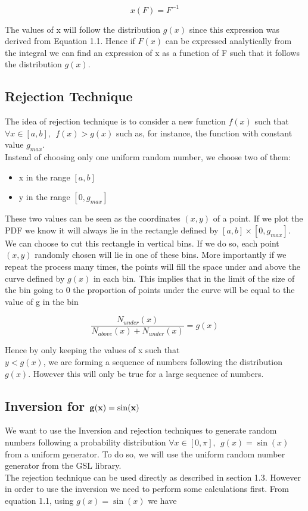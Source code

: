 \documentclass[10 pt]{article}
\numberwithin{equation}{section}
\begin{document}
\begin{multicols}{2}
\begin{equation}
x(F) = F^{-1}
\end{equation}

The values of x will follow the distribution $g(x)$ since this expression was derived from Equation 1.1. Hence if $F(x)$ can be expressed analytically from the integral we can find an expression of x as a function of F such that it follows the distribution $g(x)$.

\subsection{Rejection Technique}
The idea of rejection technique\cite{reject} is to consider a new function $f(x)$ such that $\forall x \in [a,b],\ \ f(x) > g(x)$ such as, for instance, the function with constant value $g_{max}$.\\Instead of choosing only one uniform random number, we choose two of them:
\begin{itemize}
\item x in the range $[a,b]$
\item y in the range $[0,g_{max}]$
\end{itemize}
These two values can be seen as the coordinates $(x,y)$ of a point. If we plot the PDF we know it will always lie in the rectangle defined by $[a,b] \times [0,g_{max}]$.\\ We can choose to cut this rectangle in vertical bins. If we do so, each point $(x,y)$ randomly chosen will lie in one of these bins. More importantly if we repeat the process many times, the points will fill the space under and above the curve defined by $g(x)$ in each bin. This implies that in the limit of the size of the bin going to 0 the proportion of points under the curve will be equal to the value of g in the bin

\begin{equation}
\frac{N_{under}(x)}{N_{above}(x) + N_{under}(x)} = g(x)
\end{equation}

Hence by only keeping the values of x such that \\$y < g(x)$, we are forming a sequence of numbers following the distribution $g(x)$. However this will only be true for a large sequence of numbers.

\subsection{Inversion for $\bf g(x) = \sin(x)$}
We want to use the Inversion and rejection techniques to generate random numbers following a probability distribution $\forall x \in [0,\pi],\ \ g(x) = \sin (x)$ from a uniform generator. To do so, we will use the uniform random number generator from the GSL library\cite{gsl}.\\
The rejection technique can be used directly as described in section 1.3. However in order to use the inversion we need to perform some calculations first. From equation 1.1, using $g(x)=\sin(x)$ we have


\end{multicols}
\end{document}
